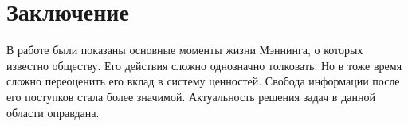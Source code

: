 \section{Заключение}
В работе были показаны основные моменты жизни Мэннинга, о которых известно обществу.
Его действия сложно однозначно толковать.
Но в тоже время сложно переоценить его вклад в систему ценностей.
Свобода информации после его поступков стала более значимой.
Актуальность решения задач в данной области оправдана.

